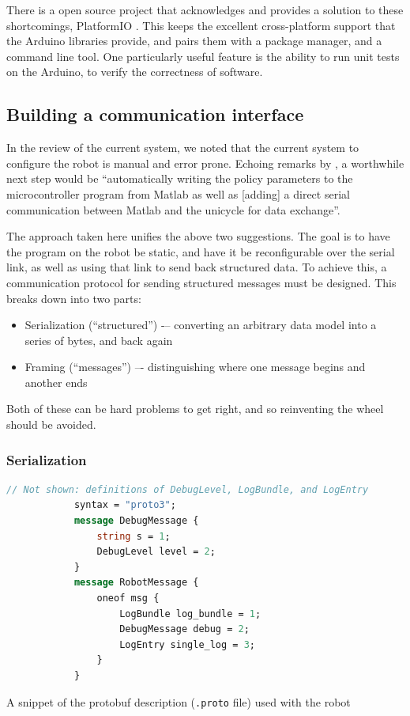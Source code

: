 \documentclass[main.tex]{subfiles}
\begin{document}
	There is a open source project that acknowledges and provides a solution to these shortcomings, PlatformIO \cite{platformio}.
	This keeps the excellent cross-platform support that the Arduino libraries provide, and pairs them with a package manager, and a command line tool.
	One particularly useful feature is the ability to run unit tests on the Arduino, to verify the correctness of software.

\subsection{Building a communication interface}
	\label{sec:comms}

	In the review of the current system, we noted that the current system to configure the robot is manual and error prone.
	Echoing remarks by \citeauthor{aleksi} \cite[p.~34]{aleksi}, a worthwhile next step would be \enquote{automatically writing the policy parameters to the microcontroller program from Matlab as well as [adding] a direct serial communication between Matlab and the unicycle for data exchange}.

	The approach taken here unifies the above two suggestions.
	The goal is to have the program on the robot be static, and have it be reconfigurable over the serial link, as well as using that link to send back structured data.
	To achieve this, a communication protocol for sending structured messages must be designed. This breaks down into two parts:
	\begin{itemize}[noitemsep]
		\item Serialization (\enquote{structured}) -– converting an arbitrary data model into a series of bytes, and back again
		\item Framing (\enquote{messages}) –- distinguishing where one message begins and another ends
	\end{itemize}
	Both of these can be hard problems to get right, and so reinventing the wheel should be avoided.

	\subsubsection{Serialization}

		\begin{listingfloat}[t]
			\begin{lstlisting}[language=proto, gobble=6, frame=single]
			// Not shown: definitions of DebugLevel, LogBundle, and LogEntry
			syntax = "proto3";
			message DebugMessage {
				string s = 1;
				DebugLevel level = 2;
			}
			message RobotMessage {
				oneof msg {
					LogBundle log_bundle = 1;
					DebugMessage debug = 2;
					LogEntry single_log = 3;
				}
			}
			\end{lstlisting}
			\caption{A snippet of the protobuf description (\texttt{.proto} file) used with the robot}
			\label{lst:proto}
		\end{listingfloat}
\end{document}
